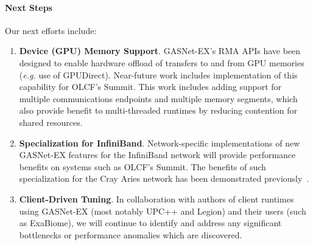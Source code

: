 \paragraph{Next Steps}

Our next efforts include:
\begin{enumerate}

\item \textbf{Device (GPU) Memory Support}.
GASNet-EX's RMA APIs have been designed to enable hardware offload of
transfers to and from GPU memories (\textit{e.g.} use of GPUDirect).
Near-future work includes implementation of this capability for OLCF's
Summit.  This work includes adding support for multiple
communications endpoints and multiple memory segments, which also provide
benefit to multi-threaded runtimes by reducing contention for shared resources.

\item \textbf{Specialization for InfiniBand}.  Network-specific implementations
of new GASNet-EX features for the InfiniBand network will provide performance
benefits on systems such as OLCF's Summit.  The benefits of such specialization
for the Cray Aries network has been demonstrated previously~\cite{gasnet-aries}.

\item \textbf{Client-Driven Tuning}.  In collaboration with authors of client
runtimes using GASNet-EX (most notably UPC++ and Legion) and their users (such
as ExaBiome), we will continue to identify and address any significant
bottlenecks or performance anomalies which are discovered.

\end{enumerate}
